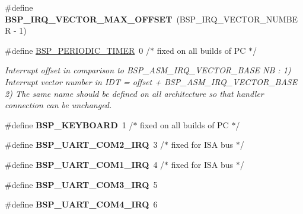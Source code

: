 \begin{DoxyCompactItemize}
\item 
\mbox{\label{group__i386__irq_ga72af65b0443ca3562967f1808e596ef0}} 
\#define {\bfseries B\+S\+P\+\_\+\+I\+R\+Q\+\_\+\+V\+E\+C\+T\+O\+R\+\_\+\+M\+A\+X\+\_\+\+O\+F\+F\+S\+ET}~(B\+S\+P\+\_\+\+I\+R\+Q\+\_\+\+V\+E\+C\+T\+O\+R\+\_\+\+N\+U\+M\+B\+ER -\/ 1)
\item 
\mbox{\label{group__i386__irq_ga70bcb445450b9fe20d8dfbc4d352a3bb}} 
\#define \mbox{\hyperlink{group__i386__irq_ga70bcb445450b9fe20d8dfbc4d352a3bb}{B\+S\+P\+\_\+\+P\+E\+R\+I\+O\+D\+I\+C\+\_\+\+T\+I\+M\+ER}}~0 /$\ast$ fixed on all builds of PC $\ast$/
\begin{DoxyCompactList}\small\item\em Interrupt offset in comparison to B\+S\+P\+\_\+\+A\+S\+M\+\_\+\+I\+R\+Q\+\_\+\+V\+E\+C\+T\+O\+R\+\_\+\+B\+A\+SE NB \+: 1) Interrupt vector number in I\+DT = offset + B\+S\+P\+\_\+\+A\+S\+M\+\_\+\+I\+R\+Q\+\_\+\+V\+E\+C\+T\+O\+R\+\_\+\+B\+A\+SE 2) The same name should be defined on all architecture so that handler connection can be unchanged. \end{DoxyCompactList}\item 
\mbox{\label{group__i386__irq_gaa58c4c8c6c58af33349e6de2f520b556}} 
\#define {\bfseries B\+S\+P\+\_\+\+K\+E\+Y\+B\+O\+A\+RD}~1 /$\ast$ fixed on all builds of PC $\ast$/
\item 
\mbox{\label{group__i386__irq_ga70bc7d5e6fe1e9788d8cb8403ad054d0}} 
\#define {\bfseries B\+S\+P\+\_\+\+U\+A\+R\+T\+\_\+\+C\+O\+M2\+\_\+\+I\+RQ}~3 /$\ast$ fixed for I\+SA bus $\ast$/
\item 
\mbox{\label{group__i386__irq_ga6931bf5865dd42b38a83e29eb782db60}} 
\#define {\bfseries B\+S\+P\+\_\+\+U\+A\+R\+T\+\_\+\+C\+O\+M1\+\_\+\+I\+RQ}~4 /$\ast$ fixed for I\+SA bus $\ast$/
\item 
\mbox{\label{group__i386__irq_ga1cbdf777ef42e6f88823bed37aa8f959}} 
\#define {\bfseries B\+S\+P\+\_\+\+U\+A\+R\+T\+\_\+\+C\+O\+M3\+\_\+\+I\+RQ}~5
\item 
\mbox{\label{group__i386__irq_ga53a47d06836545df860ae4a7c2b2d14c}} 
\#define {\bfseries B\+S\+P\+\_\+\+U\+A\+R\+T\+\_\+\+C\+O\+M4\+\_\+\+I\+RQ}~6

\end{DoxyCompactItemize}
